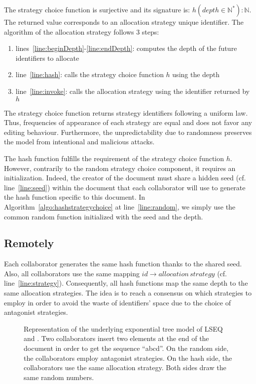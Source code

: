 The strategy choice function is surjective and its signature is: $h(depth \in
\mathbb{N}^*):\mathbb{N}$. The returned value corresponds to an allocation
strategy unique identifier. The algorithm of the allocation strategy \NAME{}
follows 3 steps:
\begin{enumerate}
\item lines~\ref{line:beginDepth}-\ref{line:endDepth}: computes the depth of
  the future identifiers to allocate
\item line~\ref{line:hash}: calls the strategy choice function $h$ using the
  depth
\item line~\ref{line:invoke}: calls the allocation strategy using the
  identifier returned by $h$
\end{enumerate}

The strategy choice function returns strategy identifiers following a uniform
law. Thus, frequencies of appearance of each strategy are equal and does not
favor any editing behaviour. Furthermore, the unpredictability due to
randomness preserves the model from intentional and malicious attacks.

The hash function fulfills the requirement of the strategy choice function $h$.
However, contrarily to the random strategy choice component, it requires
an initialization. Indeed, the creator of the document must share a hidden
seed (cf. line~\ref{line:seed}) within the document that each collaborator
will use to generate the hash function specific to this document. In
Algorithm~\ref{algo:hashstrategychoice} at line~\ref{line:random}, we simply
use the common random function initialized with the seed and the depth.

\subsection{Remotely}

Each collaborator generates the same hash function thanks to the shared
seed. Also, all collaborators use the same mapping $id\rightarrow
allocation\,strategy$ (cf. line~\ref{line:strategy}). Consequently, all hash
functions map the same depth to the same allocation strategies. The idea is to
reach a consensus on which strategies to employ in order to avoid the waste of
identifiers' space due to the choice of antagonist strategies.

\begin{figure}[h]
\begin{center}

\caption{Representation of the underlying exponential tree model of LSEQ and
  \NAME{}. Two collaborators insert two elements at the end of the document in
  order to get the sequence ``abcd''. On the random side, the collaborators
  employ antagonist strategies. On the hash side, the collaborators use the
  same allocation strategy. Both sides draw the same random numbers.}
\label{fig:hashexample}
\end{center}
\end{figure}

